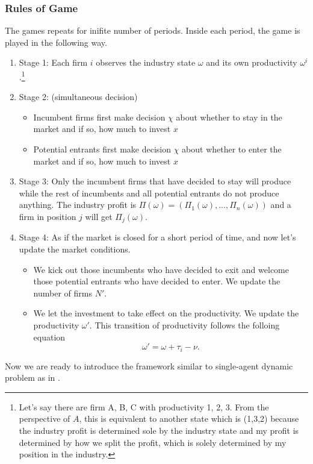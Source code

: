 \documentclass[12pt]{article}[margin=1in]
\begin{document}
\subsubsection{Rules of Game} The games repeats for inifite number of periods. Inside each period, the game is played in the following way.
\begin{enumerate}
    \item Stage 1: Each firm $i$ observes the industry state $\omega$ and its own productivity $\omega^i$.\footnote{Let's say there are firm A, B, C with productivity 1, 2, 3. From the perspective of $A$, this is equivalent to another state which is (1,3,2) because the industry profit is determined sole by the industry state and my profit is determined by how we split the profit, which is solely determined by my position in the industry.}
    \item Stage 2: (simultaneous decision)
          \begin{itemize}
              \item Incumbent firms first make decision $\chi$ about whether to stay in the market and if so, how much to invest $x$
              \item Potential entrants first make decision $\chi$ about whether to enter the market and if so, how much to invest $x$
          \end{itemize}
    \item Stage 3: Only the incumbent firms that have decided to stay will produce while the rest of incumbents and all potential entrants do not produce anything. The industry profit is $\Pi(\omega)=(\Pi_1(\omega),\ldots,\Pi_n(\omega))$ and a firm in position $j$ will get $\Pi_j(\omega)$.
    \item Stage 4: As if the market is closed for a short period of time, and now let's update the market conditions.
          \begin{itemize}
              \item We kick out those incumbents who have decided to exit and welcome those potential entrants who have decided to enter. We update the number of firms $N'$.
              \item We let the investment to take effect on the productivity. We update the productivity $\omega'$. This transition of productivity follows the folloing equation $$\omega'=\omega+\tau_i-\nu.$$
          \end{itemize}
\end{enumerate}

Now we are ready to introduce the framework similar to single-agent dynamic problem as in \citet{rust1987optimal}.
\end{document}
